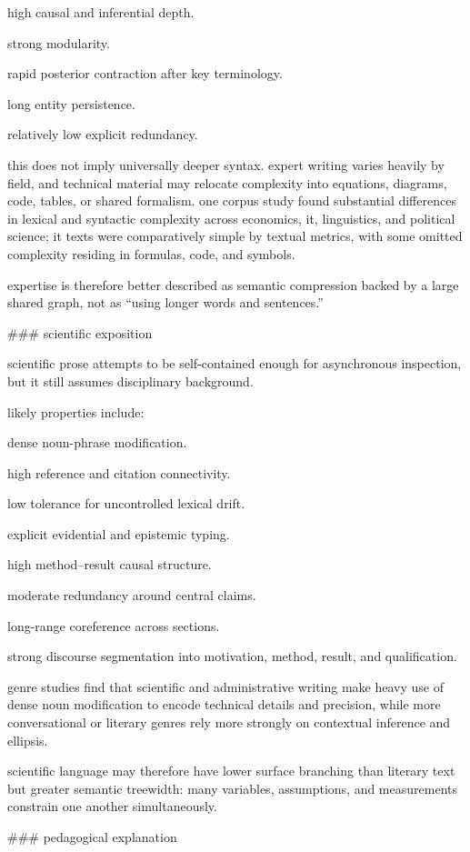 high causal and inferential depth.

strong modularity.

rapid posterior contraction after key terminology.

long entity persistence.

relatively low explicit redundancy.

this does not imply universally deeper syntax. expert writing varies heavily by field, and technical material may relocate complexity into equations, diagrams, code, tables, or shared formalism. one corpus study found substantial differences in lexical and syntactic complexity across economics, it, linguistics, and political science; it texts were comparatively simple by textual metrics, with some omitted complexity residing in formulas, code, and symbols.

expertise is therefore better described as semantic compression backed by a large shared graph, not as “using longer words and sentences.”

### scientific exposition

scientific prose attempts to be self-contained enough for asynchronous inspection, but it still assumes disciplinary background.

likely properties include:

dense noun-phrase modification.

high reference and citation connectivity.

low tolerance for uncontrolled lexical drift.

explicit evidential and epistemic typing.

high method–result causal structure.

moderate redundancy around central claims.

long-range coreference across sections.

strong discourse segmentation into motivation, method, result, and qualification.

genre studies find that scientific and administrative writing make heavy use of dense noun modification to encode technical details and precision, while more conversational or literary genres rely more strongly on contextual inference and ellipsis.

scientific language may therefore have lower surface branching than literary text but greater semantic treewidth: many variables, assumptions, and measurements constrain one another simultaneously.

### pedagogical explanation

